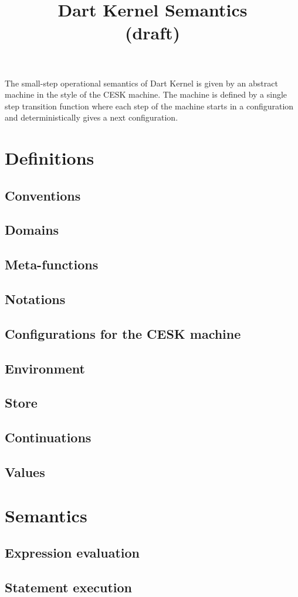 \documentclass{article}
\begin{document}
\title{Dart Kernel Semantics \\ (draft)}

\maketitle

The small-step operational semantics of Dart Kernel is given by an abstract machine in the style of the CESK machine. The machine is defined by a single step transition function where each step of the machine starts in a configuration and deterministically gives a next configuration.

\section{Definitions}
\subsection{Conventions}
\subsection{Domains}
\subsection{Meta-functions}
\subsection{Notations}
\subsection{Configurations for the CESK machine}
\subsection{Environment}
\subsection{Store}
\subsection{Continuations}
\subsection{Values}
\section{Semantics}
\subsection{Expression evaluation}
\subsection{Statement execution}
\end{document}

